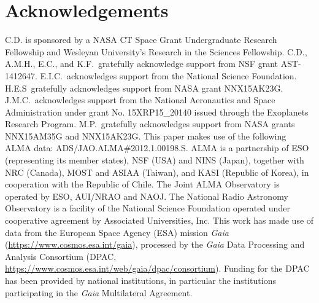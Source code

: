 \documentclass[modern]{aastex62}
\begin{document}
\section*{Acknowledgements}
C.D. is sponsored by a NASA CT Space Grant Undergraduate Research Fellowship and Wesleyan University's Research in the Sciences Fellowship.  
C.D., A.M.H., E.C., and K.F.~gratefully acknowledge support from NSF grant AST-1412647.  
E.I.C.~acknowledges support from the National Science Foundation.
H.E.S~gratefully acknowledges support from NASA grant NNX15AK23G.
J.M.C.~acknowledges support from the National Aeronautics and Space Administration under grant No. 15XRP15\_20140 issued through the Exoplanets Research Program.
M.P.~gratefully acknowledges support from NASA grants NNX15AM35G and NNX15AK23G.
This paper makes use of the following ALMA data:  ADS/JAO.ALMA\#2012.1.00198.S.  
ALMA is a partnership of ESO (representing its member states), NSF (USA) and NINS (Japan), together with NRC (Canada), MOST and ASIAA (Taiwan), and KASI (Republic of Korea), in cooperation with the Republic of Chile.  
The Joint ALMA Observatory is operated by ESO, AUI/NRAO and NAOJ.  
The National Radio Astronomy Observatory is a facility of the National Science Foundation operated under cooperative agreement by Associated Universities, Inc.
This work has made use of data from the European Space Agency (ESA) mission {\it Gaia} (\url{https://www.cosmos.esa.int/gaia}), processed by the {\it Gaia}
Data Processing and Analysis Consortium (DPAC, \url{https://www.cosmos.esa.int/web/gaia/dpac/consortium}). 
Funding for the DPAC has been provided by national institutions, in particular the institutions participating in the {\it Gaia} Multilateral Agreement.

\clearpage
% 

\end{document}
